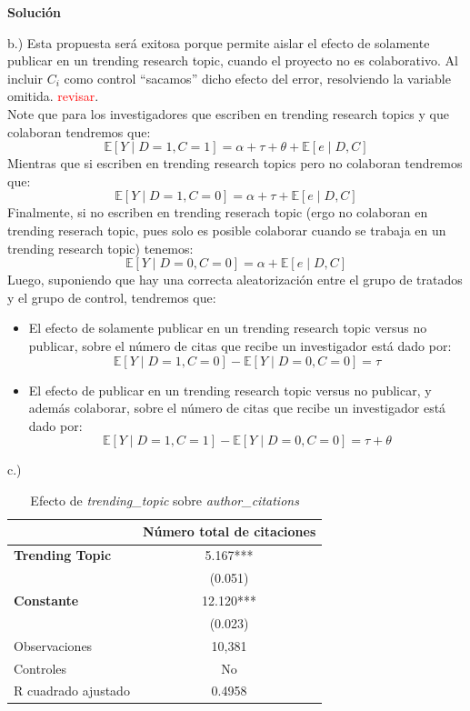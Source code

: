 \documentclass[a4paper, answers, addpoints, 11pt]{exam}
\newenvironment{solucion}{%
  \begin{mdframed}[
    backgroundcolor=blue!5,    %
    linecolor=blue!50,          %
    linewidth=2pt,              %
    leftmargin=10pt,            %
    rightmargin=10pt,           %
    topline=true,              %
    bottomline=true,            %
    roundcorner=10pt,           %
    innerleftmargin=10pt,       %
    innerrightmargin=10pt,      %
    innerbottommargin=10pt,     %
    innertopmargin=10pt         %
  ]%
  \begin{tcolorbox}[colframe=blue!50!black, colback=blue!50, coltitle=white, sharp corners=all, boxrule=1mm, width=\textwidth, halign=left, valign=center, top=0mm, bottom=0mm, left=0mm, right=0mm] \textbf{Solución} \end{tcolorbox} }{\end{mdframed}}
\begin{document}
\begin{itemize}
\begin{solucion}
       


        b.) Esta propuesta será exitosa porque permite aislar el efecto de solamente publicar en un trending research topic, cuando el proyecto no es colaborativo. Al incluir $C_i$ como control ``sacamos'' dicho efecto del error, resolviendo la variable omitida.  \textcolor{red}{revisar}. \\
          
        
        Note que para los investigadores que escriben en trending research topics y que colaboran tendremos que:
       \[
\mathbb{E}[Y \mid D=1, C=1] = \alpha + \tau + \theta +\mathbb{E}[e \mid D, C]
\]
Mientras que si escriben en trending research topics pero no colaboran tendremos que:
       \[
\mathbb{E}[Y \mid D=1, C=0] = \alpha + \tau +\mathbb{E}[e \mid D, C]  
\]
Finalmente, si no escriben en trending reserach topic (ergo no colaboran en trending reserach topic, pues solo es posible colaborar cuando se trabaja en un trending research topic) tenemos:
  \[
\mathbb{E}[Y \mid D=0, C=0] = \alpha +\mathbb{E}[e \mid D, C]  
\]
Luego, suponiendo que hay una correcta aleatorización entre el grupo de tratados y el grupo de control, tendremos que:
\begin{itemize}
    \item El efecto de solamente publicar en un trending research topic versus no publicar, sobre el número de citas que recibe un investigador está dado por:
    \[
\mathbb{E}[Y \mid D=1, C=0]- \mathbb{E}[Y \mid D=0, C=0] =  \tau   
\]

    \item El efecto de publicar en un trending research topic versus no publicar, y además colaborar, sobre el número de citas que recibe un investigador está dado por:
    \[
\mathbb{E}[Y \mid D=1, C=1]- \mathbb{E}[Y \mid D=0, C=0] = \tau +\theta
\]


\end{itemize}

c.)\begin{table}[H]
    \centering
    \caption{Efecto de \textit{trending\_topic} sobre \textit{author\_citations}}
    \label{tab:resultados}
    \begin{tabular}{l c}
        \toprule
        & Número total de citaciones\\
        \midrule
        \textbf{Trending Topic} & 5.167*** \\
        & (0.051) \\
        \textbf{Constante} & 12.120*** \\
        & (0.023) \\
        \midrule
        Observaciones & 10,381 \\
        Controles & No \\
        R cuadrado ajustado & 0.4958 \\
        \bottomrule
    \end{tabular}
    

\end{table}
\end{solucion}
\end{itemize}
\end{document}
